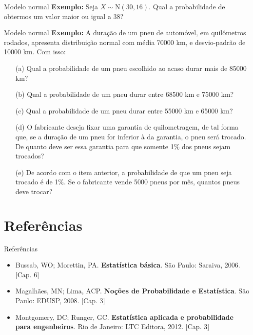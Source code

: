 \documentclass[10pt]{beamer}\usepackage[]{graphicx}\usepackage[]{color}
\providecommand{\N}{\text{N}}
\theoremstyle{definition}
\begin{document}
\begin{frame}[fragile]{Modelo normal}
  \textbf{Exemplo:} Seja $X \sim \N(30, 16)$. Qual a probabilidade de
  obtermos um valor maior ou igual a 38?
\end{frame}

\begin{frame}[fragile]{Modelo normal}
  \textbf{Exemplo:} A duração de um pneu de automóvel, em quilômetros
  rodados, apresenta distribuição normal com média 70000 km, e
  desvio-padrão de 10000 km. Com isso:
  \begin{itemize}
  \item[(a)] Qual a probabilidade de um pneu escolhido ao acaso durar mais de
    85000 km?
  \item[(b)] Qual a probabilidade de um pneu durar entre 68500 km e 75000 km?
  \item[(c)] Qual a probabilidade de um pneu durar entre 55000 km e 65000 km?
  \item[(d)] O fabricante deseja fixar uma garantia de quilometragem, de tal
    forma que, se a duração de um pneu for inferior à da garantia, o
    pneu será trocado. De quanto deve ser essa garantia para que somente
    1\% dos pneus sejam trocados?
  \item[(e)] De acordo com o item anterior, a probabilidade de que um pneu
    seja trocado é de 1\%. Se o fabricante vende 5000 pneus por mês,
    quantos pneus deve trocar?
  \end{itemize}
\end{frame}



\section{Referências}

\begin{frame}{Referências}
  \begin{itemize}
  \item Bussab, WO; Morettin, PA. \textbf{Estatística básica}. São
    Paulo: Saraiva, 2006. [Cap. 6]
  \item Magalhães, MN; Lima, ACP. \textbf{Noções de Probabilidade e
      Estatística}. São Paulo: EDUSP, 2008. [Cap. 3]
  \item Montgomery, DC; Runger, GC. \textbf{Estatística aplicada e
      probabilidade para engenheiros}. Rio de Janeiro: LTC Editora,
    2012. [Cap. 3]
  \end{itemize}
\end{frame}
\end{document}
